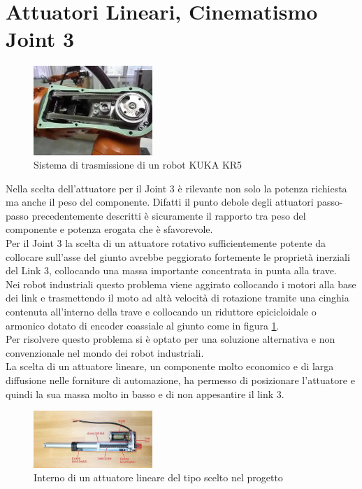 \documentclass[%
corpo=11pt,
twoside,
 stile=classica,
oldstyle,
greek,%
]{toptesi}
\begin{document}
		
	
	
	\section{Attuatori Lineari, Cinematismo Joint 3}
	\begin{figure}
		\centering
		\includegraphics[width=0.4\textwidth]{image/kukabelt.jpg}
		\caption{Sistema di trasmissione di un robot KUKA KR5}
		\label{fig:kukabelt}
	\end{figure}
	Nella scelta dell'attuatore per il Joint 3 è rilevante non solo la potenza richiesta ma anche il peso del componente. Difatti il punto debole degli attuatori passo-passo precedentemente descritti è sicuramente il rapporto tra peso del componente e potenza erogata che è sfavorevole.\\
	Per il Joint 3 la scelta di un attuatore rotativo sufficientemente potente da collocare sull'asse del giunto avrebbe peggiorato fortemente le proprietà inerziali del Link 3, collocando una massa importante concentrata in punta alla trave. \\
	Nei robot industriali questo problema viene aggirato collocando i motori alla base dei link e trasmettendo il moto ad altà velocità di rotazione tramite una cinghia contenuta all'interno della trave e collocando un riduttore epicicloidale o armonico dotato di encoder coassiale al giunto come in figura \ref{fig:kukabelt}. \\
	Per risolvere questo problema si è optato per una soluzione alternativa e non convenzionale nel mondo dei robot industriali. 
	\\
	La scelta di un attuatore lineare, un componente molto economico e di larga diffusione nelle forniture di automazione, ha permesso di posizionare l'attuatore e quindi la sua massa molto in basso e di non appesantire il link 3. \\
		\begin{figure}
		\centering
		\includegraphics[width=0.4\textwidth]{image/linearact.jpg}
		\caption{Interno di un attuatore lineare del tipo scelto nel progetto }
		\label{fig:linearact}
	\end{figure}
\end{document}
